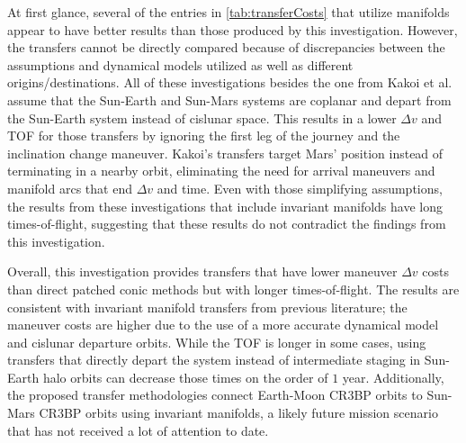 At first glance, several of the entries in \cref{tab:transferCosts} that utilize manifolds appear
to have better results than those produced by this investigation. However, the transfers cannot be
directly compared because of discrepancies between the assumptions and dynamical models utilized as
well as different origins/destinations. All of these investigations besides the one from Kakoi et
al. assume that the Sun-Earth and Sun-Mars systems are coplanar and depart from the Sun-Earth
system instead of cislunar space\cite{Topputo:2005,Haibin:2014}. This results in a lower $\Delta v$
and TOF for those transfers by ignoring the first leg of the journey and the inclination change
maneuver. Kakoi's transfers target Mars' position instead of terminating in a nearby orbit,
eliminating the need for arrival maneuvers and manifold arcs that end $\Delta v$ and
time\cite{Kakoi:2014}. Even with those simplifying assumptions, the results from these
investigations that include invariant manifolds have long times-of-flight, suggesting that these
results do not contradict the findings from this investigation.

Overall, this investigation provides transfers that have lower maneuver $\Delta v$ costs than
direct patched conic methods but with longer times-of-flight. The results are consistent with
invariant manifold transfers from previous literature; the maneuver costs are higher due to the use
of a more accurate dynamical model and cislunar departure orbits. While the TOF is longer in some
cases, using transfers that directly depart the system instead of intermediate staging in Sun-Earth
halo orbits can decrease those times on the order of $1$ year. Additionally, the proposed transfer
methodologies connect Earth-Moon CR3BP orbits to Sun-Mars CR3BP orbits using invariant manifolds, a
likely future mission scenario that has not received a lot of attention to date.
